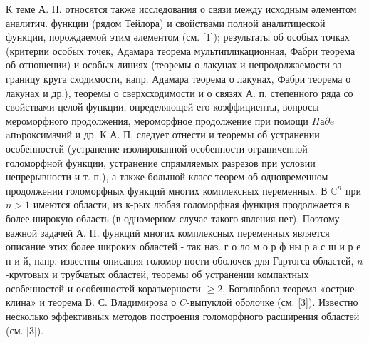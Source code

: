 \documentclass[10pt]{article}
\begin{document}
К теме А. П. относятся также исследования о связи между исходным әлементом аналитич. функции (рядом Тейлора) и свойствами полной аналитицеской функции, порождаемой этим әлементом (см. [1]); результаты об особых точках (критерии особых точек, Aдамара теорема мультипликационная, Фабри теорема об отношении) и особых линиях (теоремы о лакунах и непродолжаемости за границу круга сходимости, напр. Адамара теорема о лакунах, Фабри теорема о лакунах и др.), теоремы о сверхсходимости и о связях А. п. степенного ряда со свойствами целой функции, определяющей его коэффициенты, вопросы мероморфного продолжения, мероморфное продолжение при помощи $\Pi а \partial e$ aпnроксимачий и др. К А. П. следует отнести и теоремы об устранении особенностей (устранение изолированной особенности ограниченной голоморфной функции, устранение спрямляемых разрезов при условии непрерывности и т. п.), а также большой класс теорем об одновременном продолжении голоморфных функций многих комплексных переменных. В $\mathbb{C}^{n}$ при $n>1$ имеются области, из к-рых любая голоморфная функция продолжается в более широкую область (в одномерном случае такого явления нет). Поэтому важной задачей А. П. функций многих комплексных переменных является описание этих более широких областей - так наз. г о ло м о р ф ны р а с ш и р е н и й, напр. известны описания голомор ности оболочек для Гартогса областей, $n$-круговых и трубчатых областей, теоремы об устранении компактных особенностей и особенностей коразмерности $\geqslant 2$, Боголюбова теорема «острие клина» и теорема В. С. Владимирова о $C$-выпуклой оболочке (см. [3]). Известно несколько эффективных методов построения голоморфного расширения областей (см. [3]).
\end{document}
